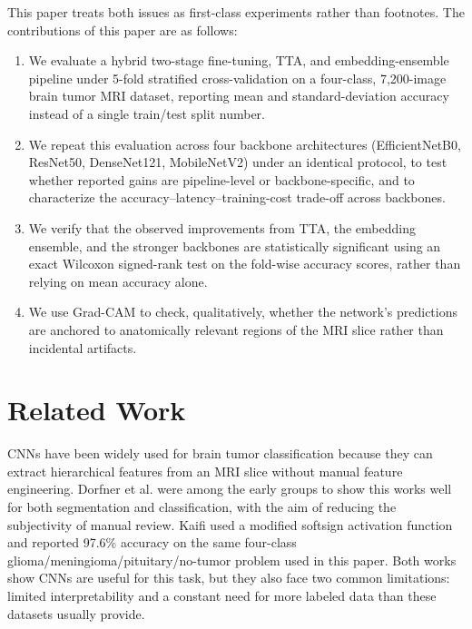 \documentclass[11pt]{article}
\begin{document}
This paper treats both issues as first-class experiments rather than footnotes. The contributions of this paper are as follows:

\begin{enumerate}
    \item We evaluate a hybrid two-stage fine-tuning, TTA, and embedding-ensemble pipeline under 5-fold stratified cross-validation on a four-class, 7,200-image brain tumor MRI dataset, reporting mean and standard-deviation accuracy instead of a single train/test split number.
    \item We repeat this evaluation across four backbone architectures (EfficientNetB0, ResNet50, DenseNet121, MobileNetV2) under an identical protocol, to test whether reported gains are pipeline-level or backbone-specific, and to characterize the accuracy--latency--training-cost trade-off across backbones.
    \item We verify that the observed improvements from TTA, the embedding ensemble, and the stronger backbones are statistically significant using an exact Wilcoxon signed-rank test on the fold-wise accuracy scores, rather than relying on mean accuracy alone.
    \item We use Grad-CAM to check, qualitatively, whether the network's predictions are anchored to anatomically relevant regions of the MRI slice rather than incidental artifacts.
\end{enumerate}


\section{Related Work}
\label{sec:related}

CNNs have been widely used for brain tumor classification because they can extract hierarchical features from an MRI slice without manual feature engineering. Dorfner et al. \cite{dorfner2025review} were among the early groups to show this works well for both segmentation and classification, with the aim of reducing the subjectivity of manual review. Kaifi \cite{kaifi2024enhancing} used a modified softsign activation function and reported 97.6\% accuracy on the same four-class glioma/meningioma/pituitary/no-tumor problem used in this paper. Both works show CNNs are useful for this task, but they also face two common limitations: limited interpretability and a constant need for more labeled data than these datasets usually provide.
\end{document}
